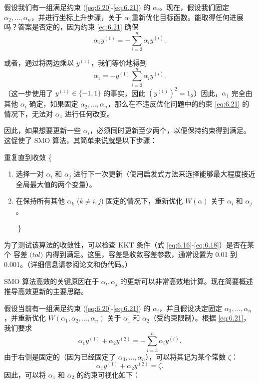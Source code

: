 假设我们有一组满足约束 (\eqref{eq:6.20}-\eqref{eq:6.21}) 的 $\alpha_i$。现在，假设我们固定 $\alpha_2, \dots, \alpha_n$，并进行坐标上升步骤，关于 $\alpha_1$重新优化目标函数。能取得任何进展吗？答案是否定的，因为约束 \eqref{eq:6.21} 确保
\[
    \alpha_1 y^{(1)} = - \sum_{i=2}^n \alpha_i y^{(i)}.
\]

或者，通过将两边乘以 $y^{(1)}$，我们等价地得到
\[
    \alpha_1 = -y^{(1)} \sum_{i=2}^n \alpha_i y^{(i)}.
\]
（这一步使用了 $y^{(1)} \in \{-1, 1\}$ 的事实，因此 $(y^{(1)})^2 = 1$。）因此，$\alpha_1$ 完全由其他 $\alpha_i$ 确定，如果固定 $\alpha_2, \dots, \alpha_n$，那么在不违反优化问题中的约束 \eqref{eq:6.21} 的情况下，无法对 $\alpha_1$ 进行任何改变。

因此，如果想要更新一些 $\alpha_i$，必须同时更新至少两个，以便保持约束得到满足。这促使了 SMO 算法，其简单来说就是以下步骤：

\begin{samepage}
重复直到收敛 \{
\vspace{-0.5em}
\begin{enumerate}
\setlength{\itemindent}{2em}
    \item 选择一对 $\alpha_i$ 和 $\alpha_j$ 进行下一次更新（使用启发式方法来选择能够最大程度接近全局最大值的两个变量）。
    \item 在保持所有其他 $\alpha_k$ ($k \ne i, j$) 固定的情况下，重新优化 $W(\alpha)$ 关于 $\alpha_i$ 和 $\alpha_j$。
\end{enumerate}
$\quad\quad$\}
\end{samepage}

为了测试该算法的收敛性，可以检查 KKT 条件（式 \eqref{eq:6.16}-\eqref{eq:6.18}）是否在某个 $\textit{容差 (tol)}$ 内得到满足。这里，容差是收敛容差参数，通常设置为 0.01 到 0.001。（详细信息请参阅论文和伪代码。）

SMO 算法高效的关键原因在于 $\alpha_i, \alpha_j$ 的更新可以非常高效地计算。现在简要概述推导高效更新的主要思路。

假设当前有一组满足约束 (\eqref{eq:6.20}-\eqref{eq:6.21}) 的 $\alpha_i$，并且假设决定固定 $\alpha_3, \dots, \alpha_n$，并重新优化 $W(\alpha_1, \alpha_2, \dots, \alpha_n)$ 关于 $\alpha_1$ 和 $\alpha_2$（受约束限制）。根据 \eqref{eq:6.21}，我们要求
\[
    \alpha_1 y^{(1)} + \alpha_2 y^{(2)} = - \sum_{i=3}^n \alpha_i y^{(i)}.
\]
由于右侧是固定的（因为已经固定了 $\alpha_3, \dots, \alpha_n$），可以将其记为某个常数 $\zeta$：
\begin{equation}
    \alpha_1 y^{(1)} + \alpha_2 y^{(2)} = \zeta. \label{eq:6.22}
\end{equation}
因此，可以将 $\alpha_1$ 和 $\alpha_2$ 的约束可视化如下：

